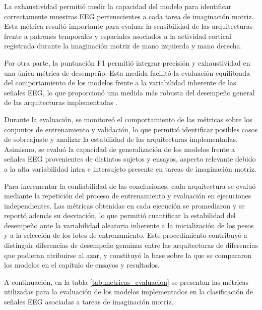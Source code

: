 La exhaustividad permitió medir la capacidad del modelo para identificar correctamente muestras EEG pertenecientes a cada tarea de imaginación motriz. Esta métrica resultó importante para evaluar la sensibilidad de las arquitecturas frente a patrones temporales y espaciales asociados a la actividad cortical registrada durante la imaginación motriz de mano izquierda y mano derecha.

Por otra parte, la puntuación F1 permitió integrar precisión y exhaustividad en una única métrica de desempeño. Esta medida facilitó la evaluación equilibrada del comportamiento de los modelos frente a la variabilidad inherente de las señales EEG, lo que proporcionó una medida más robusta del desempeño general de las arquitecturas implementadas \cite{roy2019deep, zhang2021eeg}.

Durante la evaluación, se monitoreó el comportamiento de las métricas sobre los conjuntos de entrenamiento y validación, lo que permitió identificar posibles casos de sobreajuste y analizar la estabilidad de las arquitecturas implementadas. Asimismo, se evaluó la capacidad de generalización de los modelos frente a señales EEG provenientes de distintos sujetos y ensayos, aspecto relevante debido a la alta variabilidad intra e intersujeto presente en tareas de imaginación motriz.

Para incrementar la confiabilidad de las conclusiones, cada arquitectura se evaluó mediante la repetición del proceso de entrenamiento y evaluación en ejecuciones independientes. Las métricas obtenidas en cada ejecución se promediaron y se reportó además su desviación, lo que permitió cuantificar la estabilidad del desempeño ante la variabilidad aleatoria inherente a la inicialización de los pesos y a la selección de los lotes de entrenamiento. Este procedimiento contribuyó a distinguir diferencias de desempeño genuinas entre las arquitecturas de diferencias que pudieran atribuirse al azar, y constituyó la base sobre la que se compararon los modelos en el capítulo de ensayos y resultados.

A continuación, en la tabla \ref{tab:metricas_evaluacion} se presentan las métricas utilizadas para la evaluación de los modelos implementados en la clasificación de señales EEG asociadas a tareas de imaginación motriz.

